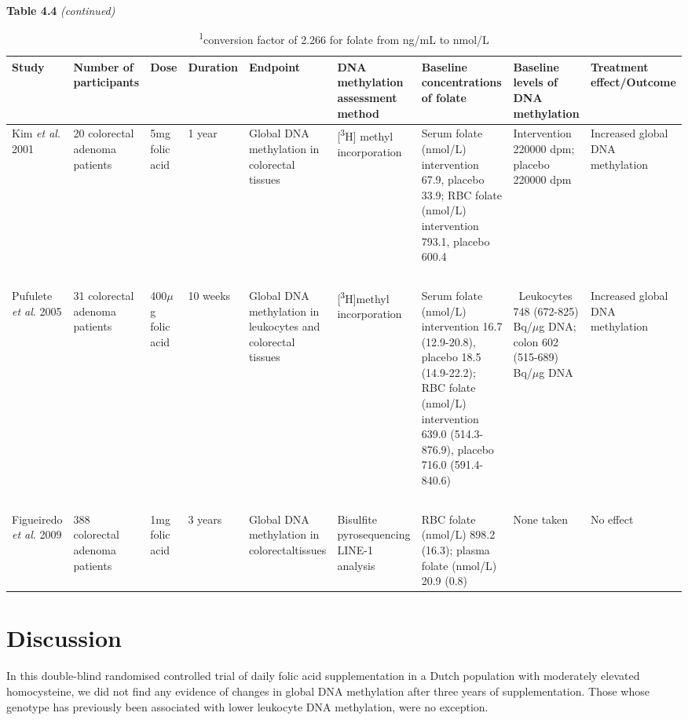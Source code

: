 \begin{sidewaystable}[hp!]
\scriptsize
\caption*{\textbf{Table 4.4} \emph{(continued)}}
\label{table4_4}
\begin{tabular}[t]{L{1.3cm}C{1.5cm}C{1.5cm}C{1.2cm}C{1.4cm}C{1.5cm}C{2.2cm}C{2cm}C{1.8cm}}
\hline
\bfseries Study & \bfseries Number of participants & \bfseries Dose & \bfseries Duration & \bfseries Endpoint & \bfseries DNA methylation assessment method & \bfseries Baseline concentrations of folate & \bfseries Baseline levels of DNA methylation & \bfseries Treatment effect/Outcome\\
\hline

{Kim \textit{et al}. 2001 \cite{c440}} & 20 colorectal adenoma patients & 5mg folic acid & 1 year & Global DNA methylation in colorectal tissues & [\textsuperscript{3}H] methyl incorporation & Serum folate (nmol/L) intervention 67.9, placebo 33.9; RBC folate (nmol/L) intervention 793.1, placebo 600.4 & Intervention 220000 dpm; placebo 220000 dpm & Increased global DNA methylation\\
~ & ~ & ~ & ~ & ~ & ~ & ~ & ~ & ~\\
{Pufulete \textit{et al}. 2005 \cite{c441}} & 31 colorectal adenoma patients & 400$\mu$g folic acid & 10 weeks & Global DNA methylation in leukocytes and colorectal tissues & [\textsuperscript{3}H]methyl incorporation & Serum folate (nmol/L) intervention 16.7 (12.9-20.8), placebo 18.5 (14.9-22.2); RBC folate (nmol/L) intervention 639.0 (514.3-876.9), placebo 716.0 (591.4-840.6) & \ Leukocytes 748 (672-825) Bq/$\mu$g DNA; colon 602 (515-689) Bq/$\mu$g DNA & Increased global DNA methylation\\
~ & ~ & ~ & ~ & ~ & ~ & ~ & ~ & ~\\
{Figueiredo \textit{et al}. 2009 \cite{c438}} & 388 colorectal adenoma patients & 1mg folic acid & 3 years & Global DNA methylation in colorectaltissues & Bisulfite pyrosequencing LINE-1 analysis & RBC folate (nmol/L) 898.2 (16.3); plasma folate (nmol/L) 20.9 (0.8) & None taken & No effect\\
\hline
\end{tabular}
\caption*{\footnotesize{\textsuperscript{1}conversion factor of 2.266 for folate from ng/mL to nmol/L}}
\end{sidewaystable}
 
\section[]{Discussion} %
\noindent In this double-blind randomised controlled trial of daily folic acid supplementation in a Dutch population with moderately elevated homocysteine, we did not find any evidence of changes in global DNA methylation after three years of supplementation. Those whose genotype has previously been associated with lower leukocyte DNA methylation, were no exception. 
 
